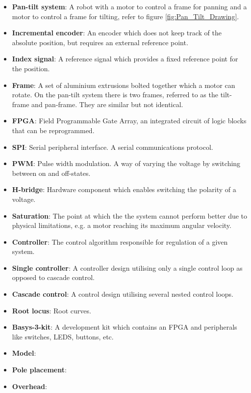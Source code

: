 \documentclass[../../main.tex]{subfiles}
\begin{document}
\label{sec:wordlist}
\begin{itemize}
    \item \textbf{Pan-tilt system}: A robot with a motor to control a frame for panning and a motor to control a frame for tilting, refer to figure \ref{fig:Pan_Tilt_Drawing}.
    \item \textbf{Incremental encoder}: An encoder which does not keep track of the absolute position, but requires an external reference point.
    \item \textbf{Index signal}: A reference signal which provides a fixed reference point for the position.
    \item \textbf{Frame}: A set of aluminium extrusions bolted together which a motor can rotate. On the pan-tilt system there is two frames, referred to as the tilt-frame and pan-frame. They are similar but not identical.
    \item \textbf{FPGA}: Field Programmable Gate Array, an integrated circuit of logic blocks that can be reprogrammed.
    \item \textbf{SPI}: Serial peripheral interface. A serial communications protocol.
    \item \textbf{PWM}: Pulse width modulation. A way of varying the voltage by switching between on and off-states.
    \item \textbf{H-bridge}: Hardware component which enables switching the polarity of a voltage.
    \item \textbf{Saturation}: The point at which the the system cannot perform better due to physical limitations, e.g. a motor reaching its maximum angular velocity.
    \item \textbf{Controller}: The control algorithm responsible for regulation of a given system.
    \item \textbf{Single controller}: A controller design utilising only a single control loop as opposed to cascade control.
    \item \textbf{Cascade control}: A control design utilising several nested control loops.
    \item \textbf{Root locus}: Root curves.
    \item \textbf{Basys-3-kit}: A development kit which contains an FPGA and peripherals like switches, LEDS, buttons, etc.
    \item \textbf{Model}: 
    \item \textbf{Pole placement}:
    \item \textbf{Overhead}:
    

\end{itemize}
\end{document}
